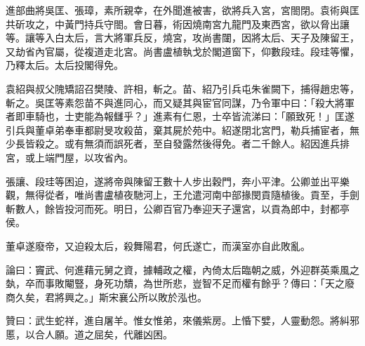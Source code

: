 \begin{pinyinscope}
進部曲將吳匡、張璋，素所親幸，在外聞進被害，欲將兵入宮，宮閤閉。袁術與匡共斫攻之，中黃門持兵守閤。會日暮，術因燒南宮九龍門及東西宮，欲以脅出讓等。讓等入白太后，言大將軍兵反，燒宮，攻尚書闥，因將太后、天子及陳留王，又劫省內官屬，從複道走北宮。尚書盧植執戈於閣道窗下，仰數段珪。段珪等懼，乃釋太后。太后投閣得免。

袁紹與叔父隗矯詔召樊陵、許相，斬之。苗、紹乃引兵屯朱雀闕下，捕得趙忠等，斬之。吳匡等素怨苗不與進同心，而又疑其與宦官同謀，乃令軍中曰：「殺大將軍者即車騎也，士吏能為報讎乎？」進素有仁恩，士卒皆流涕曰：「願致死！」匡遂引兵與董卓弟奉車都尉旻攻殺苗，棄其屍於苑中。紹遂閉北宮門，勒兵捕宦者，無少長皆殺之。或有無須而誤死者，至自發露然後得免。者二千餘人。紹因進兵排宮，或上端門屋，以攻省內。

張讓、段珪等困迫，遂將帝與陳留王數十人步出穀門，奔小平津。公卿並出平樂觀，無得從者，唯尚書盧植夜馳河上，王允遣河南中部掾閔貢隨植後。貢至，手劍斬數人，餘皆投河而死。明日，公卿百官乃奉迎天子還宮，以貢為郎中，封都亭侯。

董卓遂廢帝，又迫殺太后，殺舞陽君，何氏遂亡，而漢室亦自此敗亂。

論曰：竇武、何進藉元舅之資，據輔政之權，內倚太后臨朝之威，外迎群英乘風之埶，卒而事敗閹豎，身死功穨，為世所悲，豈智不足而權有餘乎？傳曰：「天之廢商久矣，君將興之。」斯宋襄公所以敗於泓也。

贊曰：武生蛇祥，進自屠羊。惟女惟弟，來儀紫房。上惛下嬖，人靈動怨。將糾邪慝，以合人願。道之屈矣，代離凶困。


\end{pinyinscope}